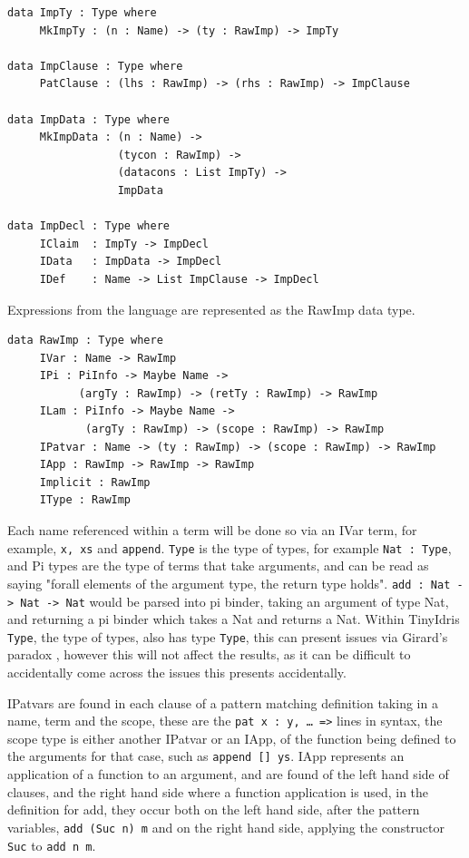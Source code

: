 \documentclass[a4paper]{article}
\begin{document}
\begin{center}
\begin{verbatim}
data ImpTy : Type where
	 MkImpTy : (n : Name) -> (ty : RawImp) -> ImpTy

data ImpClause : Type where
	 PatClause : (lhs : RawImp) -> (rhs : RawImp) -> ImpClause

data ImpData : Type where
	 MkImpData : (n : Name) -> 
				 (tycon : RawImp) ->
				 (datacons : List ImpTy) ->
				 ImpData

data ImpDecl : Type where
	 IClaim  : ImpTy -> ImpDecl
	 IData   : ImpData -> ImpDecl
	 IDef    : Name -> List ImpClause -> ImpDecl
\end{verbatim}
\end{center}

Expressions from the language are represented as the RawImp data type.

\begin{center}
\begin{verbatim}
data RawImp : Type where
	 IVar : Name -> RawImp
	 IPi : PiInfo -> Maybe Name ->
		   (argTy : RawImp) -> (retTy : RawImp) -> RawImp
	 ILam : PiInfo -> Maybe Name ->
			(argTy : RawImp) -> (scope : RawImp) -> RawImp
	 IPatvar : Name -> (ty : RawImp) -> (scope : RawImp) -> RawImp
	 IApp : RawImp -> RawImp -> RawImp
	 Implicit : RawImp
	 IType : RawImp
\end{verbatim}
\end{center}


Each name referenced within a term will be done so via an IVar term, for example, 
\texttt{x, xs} and \texttt{append}. \texttt{Type} is the type of types, for example
\texttt{Nat : Type}, and Pi types are the type
of terms that take arguments, and can be read as saying "forall elements
of the argument type, the return type holds". \texttt{add : Nat -> Nat -> Nat} would be parsed
into pi binder, taking an argument of type Nat, and returning a pi binder which takes a Nat
and returns a Nat. Within TinyIdris \texttt{Type}, the type of types,
also has type \texttt{Type}, this can present issues via 
Girard's paradox \cite{10.1007/BFb0014058}, however this will not affect the results, as it can
be difficult to accidentally come across the issues this presents accidentally.  

IPatvars are found in each clause of a pattern matching definition 
taking in a name, term and the scope, these are the 
\texttt{pat x : y, \ldots{} =>} lines in syntax, the scope type is either another
IPatvar or an IApp, of the function being defined to the arguments for that case, such as \texttt{append [] ys}.
IApp represents an application of a function to an argument, and are 
found of the left hand side of clauses, and the right hand side where 
a function application is used, in the definition for add, they occur
both on the left hand side, after the pattern variables, \texttt{add (Suc n) m} and on the right hand side, applying the constructor \texttt{Suc} to \texttt{add n m}. 
\end{document}
